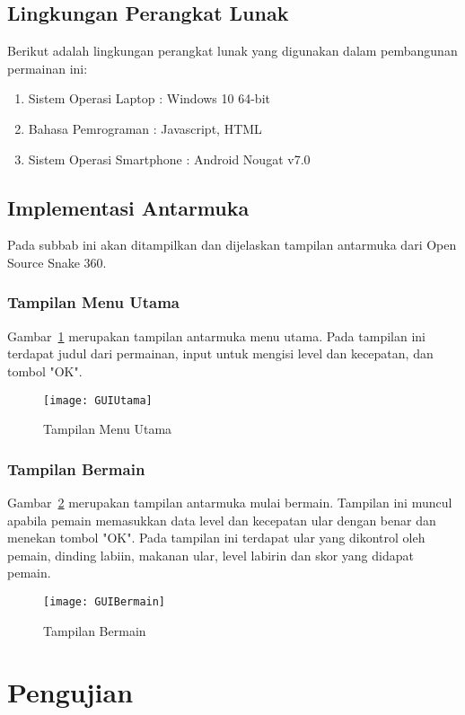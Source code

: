 \subsection{Lingkungan Perangkat Lunak}
Berikut adalah lingkungan perangkat lunak yang digunakan dalam pembangunan permainan ini:

\begin{enumerate}
	\item Sistem Operasi Laptop : Windows 10 64-bit
	\item Bahasa Pemrograman : Javascript, HTML
	\item Sistem Operasi Smartphone : Android Nougat v7.0
\end{enumerate}

\subsection{Implementasi Antarmuka}
Pada subbab ini akan ditampilkan dan dijelaskan tampilan antarmuka dari Open Source Snake 360.

\subsubsection{Tampilan Menu Utama}
Gambar~\ref{fig:GUIUtama} merupakan tampilan antarmuka menu utama. Pada tampilan ini terdapat judul dari permainan, input untuk mengisi level dan kecepatan, dan tombol "OK". 

\begin{figure}[H]
	\centering  
	\texttt{[image: GUIUtama]}  
	\caption[Tampilan Menu Utama]{Tampilan Menu Utama}
	\label{fig:GUIUtama} 
\end{figure}

\subsubsection{Tampilan Bermain}
Gambar~\ref{fig:GUIBermain} merupakan tampilan antarmuka mulai bermain. Tampilan ini muncul apabila pemain memasukkan data level dan kecepatan ular dengan benar dan menekan tombol "OK". Pada tampilan ini terdapat ular yang dikontrol oleh pemain, dinding labiin, makanan ular, level labirin dan skor yang didapat pemain.

\begin{figure}[H]
	\centering  
	\texttt{[image: GUIBermain]}  
	\caption[Tampilan Bermain]{Tampilan Bermain}
	\label{fig:GUIBermain} 
\end{figure}

\section{Pengujian}